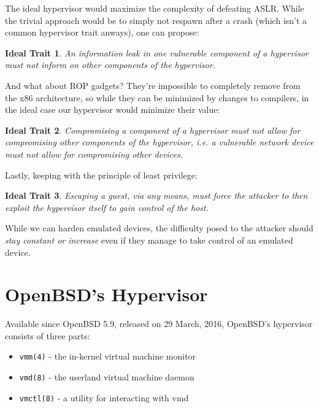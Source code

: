\documentclass[conference]{IEEEtran}
\newtheorem{trait}{Ideal Trait}
\begin{document}
The ideal hypervisor would maximize the complexity of defeating
ASLR. While the trivial approach would be to simply not respawn after
a crash (which isn't a common hypervisor trait anways), one can
propose:

\begin{trait} \label{trait1}
  An information leak in one vulnerable component of a hypervisor must
  not inform on other components of the hypervisor.
\end{trait}

And what about ROP gadgets? They're impossible to completely remove
from the x86 architecture, so while they can be minimized by changes
to compilers, in the ideal case our hypervisor would minimize their
value:

\begin{trait} \label{trait2}
  Compromising a component of a hypervisor must not allow for
  compromising other components of the hypervisor, i.e. a vulnerable
  network device must not allow for compromising other devices.
\end{trait}

Lastly, keeping with the principle of least privilege:

\begin{trait} \label{trait3}
  Escaping a guest, via any means, must force the attacker to then
  exploit the hypervisor itself to gain control of the host.
\end{trait}

While we can harden emulated devices, the difficulty posed to the
attacker should \emph{stay constant or increase} even if they manage
to take control of an emulated device.

\vspace{5mm}
\section{OpenBSD's Hypervisor}
Available since OpenBSD 5.9, released on 29 March, 2016, OpenBSD's
hypervisor consists of three parts:

\vspace{2mm}
\begin{itemize}
\item \texttt{vmm(4)} - the in-kernel virtual machine monitor
\item \texttt{vmd(8)} - the userland virtual machine daemon
\item \texttt{vmctl(8)} - a utility for interacting with vmd
\end{itemize}
\vspace{2mm}
\end{document}
